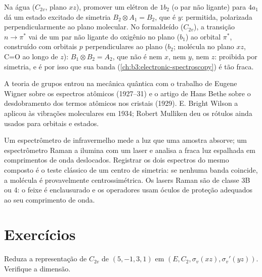 \begin{example}\label{ex:b3:group-theory-applied:electronic}
Na água ($C_{2v}$, plano $xz$), promover um elétron de $1b_2$ (o par não ligante)
para $4a_1$ dá um estado excitado de simetria $B_2\otimes A_1 = B_2$, que é $y$:
permitida, polarizada perpendicularmente ao plano molecular. No formaldeído
($C_{2v}$), a transição $n\to\pi^*$ vai de um par não ligante do oxigênio no plano ($b_1$)
ao orbital $\pi^*$, construído com orbitais $p$ perpendiculares ao plano
($b_2$; molécula no plano $xz$, C=O ao longo de $z$): $B_1\otimes B_2 = A_2$,
que não é nem $x$, nem $y$, nem $z$: proibida por simetria, e é por isso que sua banda
(\cref{ch:b3:electronic-spectroscopy}) é tão fraca.
\end{example}

\begin{history}
A teoria de grupos entrou na mecânica quântica com o trabalho de Eugene
Wigner sobre os espectros atômicos (1927--31) e o artigo de Hans Bethe sobre
o desdobramento dos termos atômicos nos cristais (1929). E. Bright Wilson a
aplicou às vibrações moleculares em 1934; Robert Mulliken deu os rótulos
ainda usados para orbitais e estados.
\end{history}

\begin{inthelab}
Um espectrômetro de infravermelho mede a luz que uma amostra absorve; um
espectrômetro Raman a ilumina com um laser e analisa a fraca luz espalhada
em comprimentos de onda deslocados. Registrar os dois espectros do mesmo
composto é o teste clássico de um centro de simetria: se nenhuma banda
coincide, a molécula é provavelmente centrossimétrica. Os lasers Raman são de
classe 3B ou 4: o feixe é enclausurado e os operadores usam óculos de
proteção adequados ao seu comprimento de onda.
\end{inthelab}

\section{Exercícios}

\begin{exercise}[$\star$]\label{exo:b3:group-theory-applied:1}
Reduza a representação de $C_{2v}$ de  $(5, -1, 3, 1)$ em $(E, C_2,
\sigma_v(xz), \sigma_v'(yz))$. Verifique a dimensão.
\end{exercise}

